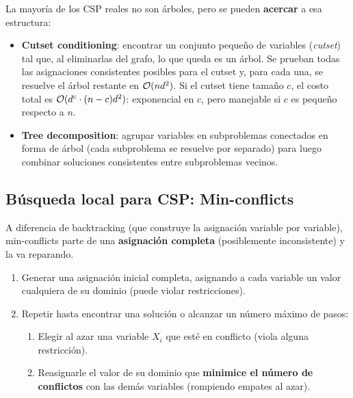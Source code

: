 La mayoría de los CSP reales no son árboles, pero se pueden \textbf{acercar} a esa estructura:

\begin{itemize}
    \item \textbf{Cutset conditioning}: encontrar un conjunto pequeño de variables (\emph{cutset}) tal que, al eliminarlas
    del grafo, lo que queda es un árbol. Se prueban todas las asignaciones consistentes posibles para el cutset y, para
    cada una, se resuelve el árbol restante en $\mathcal{O}(nd^2)$. Si el cutset tiene tamaño $c$, el costo total es
    $\mathcal{O}(d^c \cdot (n-c)d^2)$: exponencial en $c$, pero manejable si $c$ es pequeño respecto a $n$.
    \item \textbf{Tree decomposition}: agrupar variables en subproblemas conectados en forma de árbol (cada subproblema
    se resuelve por separado) para luego combinar soluciones consistentes entre subproblemas vecinos.
\end{itemize}

\subsection{Búsqueda local para CSP: Min-conflicts}

A diferencia de backtracking (que construye la asignación variable por variable), min-conflicts parte de una
\textbf{asignación completa} (posiblemente inconsistente) y la va reparando.

\begin{definition}
    \begin{enumerate}
        \item Generar una asignación inicial completa, asignando a cada variable un valor cualquiera de su dominio
        (puede violar restricciones).
        \item Repetir hasta encontrar una solución o alcanzar un número máximo de pasos:
        \begin{enumerate}
            \item Elegir al azar una variable $X_i$ que esté en conflicto (viola alguna restricción).
            \item Reasignarle el valor de su dominio que \textbf{minimice el número de conflictos} con las demás
            variables (rompiendo empates al azar).
        \end{enumerate}
    \end{enumerate}
\end{definition}

